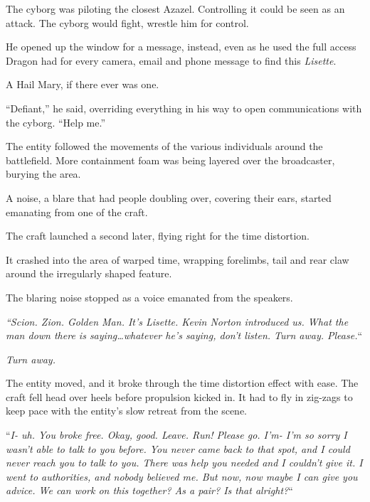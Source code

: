 The cyborg was piloting the closest Azazel.  Controlling it could be seen as an attack.  The cyborg would fight, wrestle him for control.



He opened up the window for a message, instead, even as he used the full access Dragon had for every camera, email and phone message to find this \emph{Lisette}.



A Hail Mary, if there ever was one.



``Defiant,'' he said, overriding everything in his way to open communications with the cyborg.  ``Help me.''



\blacksquare



The entity followed the movements of the various individuals around the battlefield.  More containment foam was being layered over the broadcaster, burying the area.



A noise, a blare that had people doubling over, covering their ears, started emanating from one of the craft.



The craft launched a second later, flying right for the time distortion.



It crashed into the area of warped time, wrapping forelimbs, tail and rear claw around the irregularly shaped feature.



The blaring noise stopped as a voice emanated from the speakers.



\emph{``Scion.  Zion.  Golden Man.  It's Lisette.  Kevin Norton introduced us.  What the man down there is saying\ldots whatever he's saying, don't listen.  Turn away.  Please.}``



\emph{Turn away.}



The entity moved, and it broke through the time distortion effect with ease.  The craft fell head over heels before propulsion kicked in.  It had to fly in zig-zags to keep pace with the entity's slow retreat from the scene.



``\emph{I- uh.  You broke free.  Okay, good.  Leave.  Run!  Please go.  I'm- I'm so sorry I wasn't able to talk to you before.  You never came back to that spot, and I could never reach you to talk to you.  There was help you needed and I couldn't give it.  I went to authorities, and nobody believed me.  But now, now maybe I can give you advice.  We can work on this together?  As a pair?  Is that alright?}``



